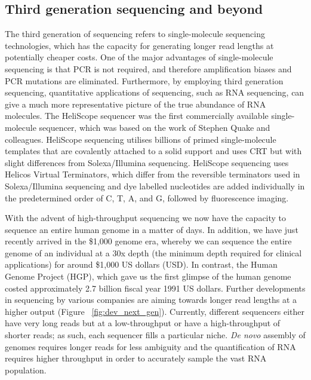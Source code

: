 \subsection{Third generation sequencing and beyond}

The third generation of sequencing refers to single-molecule sequencing technologies, which has the capacity for generating longer read lengths at potentially cheaper costs\cite{pmid20858600}. One of the major advantages of single-molecule sequencing is that PCR is not required, and therefore amplification biases and PCR mutations are eliminated. Furthermore, by employing third generation sequencing, quantitative applications of sequencing, such as RNA sequencing, can give a much more representative picture of the true abundance of RNA molecules. The HeliScope sequencer was the first commercially available single-molecule sequencer, which was based on the work of Stephen Quake and colleagues\cite{pmid12651960}. HeliScope sequencing utilises billions of primed single-molecule templates that are covalently attached to a solid support and uses CRT but with slight differences from Solexa/Illumina sequencing. HeliScope sequencing uses Helicos Virtual Terminators, which differ from the reversible terminators used in Solexa/Illumina sequencing and dye labelled nucleotides are added individually in the predetermined order of C, T, A, and G, followed by fluorescence imaging.

With the advent of high-throughput sequencing we now have the capacity to sequence an entire human genome in a matter of days. In addition, we have just recently arrived in the \$1,000 genome era, whereby we can sequence the entire genome of an individual at a 30x depth (the minimum depth required for clinical applications) for around \$1,000 US dollars (USD). In contrast, the Human Genome Project (HGP), which gave us the first glimpse of the human genome\cite{lander2001initial} costed approximately 2.7 billion fiscal year 1991 US dollars\cite{nhgri2010cost}. Further developments in sequencing by various companies are aiming towards longer read lengths at a higher output (Figure ~\ref{fig:dev_next_gen}). Currently, different sequencers either have very long reads but at a low-throughput or have a high-throughput of shorter reads; as such, each sequencer fills a particular niche. \textit{De novo} assembly of genomes requires longer reads for less ambiguity and the quantification of RNA requires higher throughput in order to accurately sample the vast RNA population.

